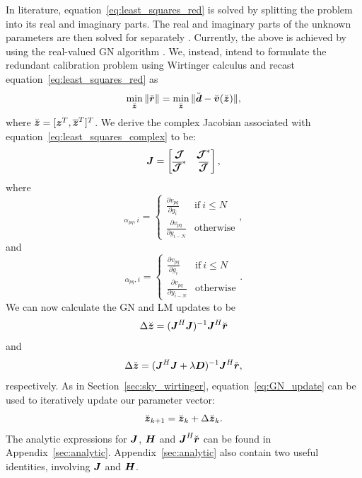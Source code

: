 \documentclass[useAMS,usenatbib]{mn2e}
\newcommand{\bz}{\bmath{z}}
\newcommand{\br}{\bmath{r}}
\newcommand{\bd}{\bmath{d}}
\newcommand{\bv}{\bmath{v}}
\newcommand{\bJ}{\bmath{J}}
\newcommand{\bD}{\bmath{D}}
\newcommand{\bH}{\bmath{H}}
\newcommand{\bmJ}{\bmath{\mathcal{J}}}
\newcommand{\conj}[1]{\overline{#1}}
\begin{document}
In literature, equation~\ref{eq:least_squares_red} is solved by splitting the problem into its real and imaginary parts. The real and imaginary parts of the unknown parameters are then solved for separately \citep{Wieringa1992,Liu2010,Zheng2014}. 
Currently, the above is achieved by using the real-valued GN algorithm \citep{Kurien2016}. 
We, instead, intend to formulate the redundant calibration problem using Wirtinger calculus and recast equation~\ref{eq:least_squares_red} as
\begin{equation}
\label{eq:least_squares_complex}
\min_{\breve{\bz}} \|\breve{\br}\| = \min_{\breve{\bz}} \|\breve{\bd} - \breve{\bv}(\breve{\bz})\|, 
\end{equation}
where $\breve{\bz} = [\bz^T,\conj{\bz}^T]^T$. 
We derive the complex Jacobian associated with equation~\ref{eq:least_squares_complex} to be:
\begin{equation}
\label{eq:Jacobian}
\bJ = \begin{bmatrix}
       \bmJ & \bmJ^*\\
       \conj{\bmJ}^* & \conj{\bmJ} 
      \end{bmatrix},
\end{equation}
where 
\begin{equation}
[\bmJ]_{\alpha_{pq},i} = \begin{cases} 
     \frac{\partial v_{pq}}{\partial g_i} & \textrm{if}~i\leq N \\
     \frac{\partial v_{pq}}{\partial y_{i-N}} & \textrm{otherwise}  
\end{cases}, %
\end{equation}
and
\begin{equation}
[\bmJ^*]_{\alpha_{pq},i} = \begin{cases} 
     \frac{\partial v_{pq}}{\partial \conj{g}_i} & \textrm{if}~i\leq N \\
     \frac{\partial v_{pq}}{\partial \conj{y}_{i-N}} & \textrm{otherwise}  
\end{cases}. %
\end{equation}
We can now calculate the GN and LM updates to be 
\begin{equation}
\label{eq:GN_update}
\Delta \breve{\bz} = (\bJ^H\bJ)^{-1}\bJ^H\breve{\br}
\end{equation}
and 
\begin{equation}
\label{eq:LM_update}
\Delta \breve{\bz} = (\bJ^H\bJ + \lambda\bD)^{-1}\bJ^H\breve{\br},
\end{equation}
respectively. As in Section~\ref{sec:sky_wirtinger}, equation~\ref{eq:GN_update} can be used to iteratively update our parameter vector:
\begin{equation}
\label{eq:update}
\breve{\bz}_{k+1} = \breve{\bz}_{k} + \Delta \breve{\bz}_{k}. 
\end{equation}
The analytic expressions for $\bJ$, $\bH$ and $\bJ^H\breve{\br}$ can be found in Appendix~\ref{sec:analytic}.
Appendix~\ref{sec:analytic} also contain two useful identities, involving $\bJ$ and $\bH$. 
\end{document}
